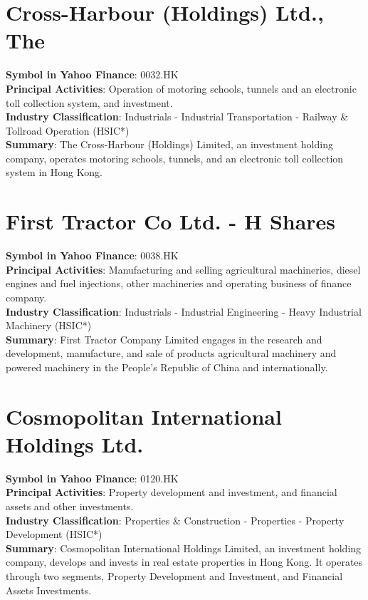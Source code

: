 \section{Cross-Harbour (Holdings) Ltd., The}
\textbf{Symbol in Yahoo Finance}: 0032.HK\\
\textbf{Principal Activities}: Operation of motoring schools, tunnels and an electronic toll collection system, and investment.\\
\textbf{Industry Classification}: Industrials - Industrial Transportation - Railway \& Tollroad Operation (HSIC*)\\
\textbf{Summary}: The Cross-Harbour (Holdings) Limited, an investment holding company, operates motoring schools, tunnels, and an electronic toll collection system in Hong Kong.


\section{First Tractor Co Ltd. - H Shares}
\textbf{Symbol in Yahoo Finance}: 0038.HK\\
\textbf{Principal Activities}: Manufacturing and selling agricultural machineries, diesel engines and fuel injections, other machineries and operating business of finance company.\\
\textbf{Industry Classification}: Industrials - Industrial Engineering - Heavy Industrial Machinery (HSIC*)\\
\textbf{Summary}: First Tractor Company Limited engages in the research and development, manufacture, and sale of products agricultural machinery and powered machinery in the People's Republic of China and internationally.


\section{Cosmopolitan International Holdings Ltd.}
\textbf{Symbol in Yahoo Finance}: 0120.HK\\
\textbf{Principal Activities}: Property development and investment, and financial assets and other investments.\\
\textbf{Industry Classification}: Properties \& Construction - Properties - Property Development (HSIC*)\\
\textbf{Summary}: Cosmopolitan International Holdings Limited, an investment holding company, develops and invests in real estate properties in Hong Kong. It operates through two segments, Property Development and Investment, and Financial Assets Investments.


